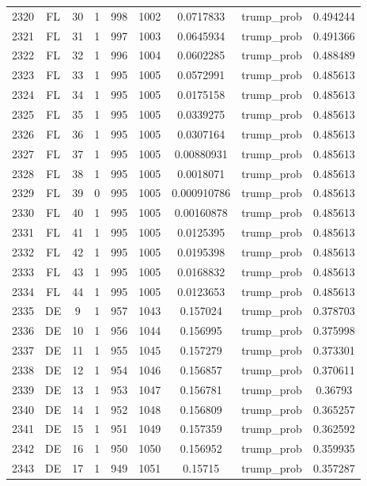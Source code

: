 \documentclass[12pt,a4paper]{article}
\begin{document}
\begin{tabular}{r|cccccccc}
	2320 & FL & 30 & 1 & 998 & 1002 & 0.0717833 & trump\_prob & 0.494244 \\
	2321 & FL & 31 & 1 & 997 & 1003 & 0.0645934 & trump\_prob & 0.491366 \\
	2322 & FL & 32 & 1 & 996 & 1004 & 0.0602285 & trump\_prob & 0.488489 \\
	2323 & FL & 33 & 1 & 995 & 1005 & 0.0572991 & trump\_prob & 0.485613 \\
	2324 & FL & 34 & 1 & 995 & 1005 & 0.0175158 & trump\_prob & 0.485613 \\
	2325 & FL & 35 & 1 & 995 & 1005 & 0.0339275 & trump\_prob & 0.485613 \\
	2326 & FL & 36 & 1 & 995 & 1005 & 0.0307164 & trump\_prob & 0.485613 \\
	2327 & FL & 37 & 1 & 995 & 1005 & 0.00880931 & trump\_prob & 0.485613 \\
	2328 & FL & 38 & 1 & 995 & 1005 & 0.0018071 & trump\_prob & 0.485613 \\
	2329 & FL & 39 & 0 & 995 & 1005 & 0.000910786 & trump\_prob & 0.485613 \\
	2330 & FL & 40 & 1 & 995 & 1005 & 0.00160878 & trump\_prob & 0.485613 \\
	2331 & FL & 41 & 1 & 995 & 1005 & 0.0125395 & trump\_prob & 0.485613 \\
	2332 & FL & 42 & 1 & 995 & 1005 & 0.0195398 & trump\_prob & 0.485613 \\
	2333 & FL & 43 & 1 & 995 & 1005 & 0.0168832 & trump\_prob & 0.485613 \\
	2334 & FL & 44 & 1 & 995 & 1005 & 0.0123653 & trump\_prob & 0.485613 \\
	2335 & DE & 9 & 1 & 957 & 1043 & 0.157024 & trump\_prob & 0.378703 \\
	2336 & DE & 10 & 1 & 956 & 1044 & 0.156995 & trump\_prob & 0.375998 \\
	2337 & DE & 11 & 1 & 955 & 1045 & 0.157279 & trump\_prob & 0.373301 \\
	2338 & DE & 12 & 1 & 954 & 1046 & 0.156857 & trump\_prob & 0.370611 \\
	2339 & DE & 13 & 1 & 953 & 1047 & 0.156781 & trump\_prob & 0.36793 \\
	2340 & DE & 14 & 1 & 952 & 1048 & 0.156809 & trump\_prob & 0.365257 \\
	2341 & DE & 15 & 1 & 951 & 1049 & 0.157359 & trump\_prob & 0.362592 \\
	2342 & DE & 16 & 1 & 950 & 1050 & 0.156952 & trump\_prob & 0.359935 \\
	2343 & DE & 17 & 1 & 949 & 1051 & 0.15715 & trump\_prob & 0.357287 \\

\end{tabular}
\end{document}
